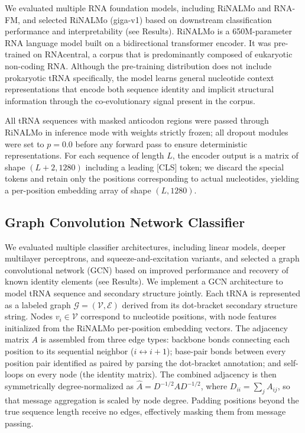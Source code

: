 \documentclass{article}
\begin{document}
We evaluated multiple RNA foundation models, including RiNALMo and RNA-FM, and selected RiNALMo (giga-v1) based on downstream classification performance and interpretability (see Results). RiNALMo is a 650M-parameter RNA language model built on a bidirectional transformer encoder. It was pre-trained on RNAcentral, a corpus that is predominantly composed of eukaryotic non-coding RNA. Although the pre-training distribution does not include prokaryotic tRNA specifically, the model learns general nucleotide context representations that encode both sequence identity and implicit structural information through the co-evolutionary signal present in the corpus.

All tRNA sequences with masked anticodon regions were passed through RiNALMo in inference mode with weights strictly frozen; all dropout modules were set to $p = 0.0$ before any forward pass to ensure deterministic representations. For each sequence of length $L$, the encoder output is a matrix of shape $(L+2, 1280)$ including a leading [CLS] token; we discard the special tokens and retain only the positions corresponding to actual nucleotides, yielding a per-position embedding array of shape $(L, 1280)$.


\subsection{Graph Convolution Network Classifier}

We evaluated multiple classifier architectures, including linear models, deeper multilayer perceptrons, and squeeze-and-excitation variants, and selected a graph convolutional network (GCN) based on improved performance and recovery of known identity elements (see Results). We implement a GCN architecture to model tRNA sequence and secondary structure jointly. Each tRNA is represented as a labeled graph $\mathcal{G} = (\mathcal{V}, \mathcal{E})$ derived from its dot-bracket secondary structure string. Nodes $v_i \in \mathcal{V}$ correspond to nucleotide positions, with node features initialized from the RiNALMo per-position embedding vectors. The adjacency matrix $A$ is assembled from three edge types: backbone bonds connecting each position to its sequential neighbor ($i \leftrightarrow i+1$); base-pair bonds between every position pair identified as paired by parsing the dot-bracket annotation; and self-loops on every node (the identity matrix). The combined adjacency is then symmetrically degree-normalized as $\hat{A} = D^{-1/2} A D^{-1/2}$, where $D_{ii} = \sum_j A_{ij}$, so that message aggregation is scaled by node degree. Padding positions beyond the true sequence length receive no edges, effectively masking them from message passing.
\end{document}
